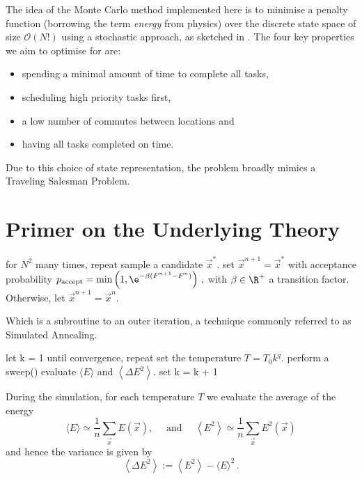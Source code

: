\documentclass{prettytex/ox/mmsc-special-topic}
\begin{document}
  The idea of the Monte Carlo method implemented here is to minimise a penalty function (borrowing the term \textit{energy} from physics) over the discrete state space of size $\mathcal{O}(N!)$ using a stochastic approach, as sketched in .
  The four key properties we aim to optimise for are:
  \begin{itemize}
    \tightlist
    \item spending a minimal amount of time to complete all tasks,
    \item scheduling high priority tasks first,
    \item a low number of commutes between locations and
    \item having all tasks completed on time.
  \end{itemize}
  Due to this choice of state representation, the problem broadly mimics a Traveling Salesman Problem.

  \section{Primer on the Underlying Theory}
  \label{sec:theory}
  \begin{algorithm}[language=pseudo,caption={\centering The Metropolis-Hastings sub-routine \parencite{metropolis, hastings}},basicstyle=\footnotesize]
for $N^2$ many times, repeat
  sample a candidate $\vec{x}^*$.
  set $\vec{x}^{n+1} = \vec{x}^*$ with acceptance probability
    $p_{\rm accept} = \min\left(1, \e^{-\beta (F^{n+1} - F^n)}\right)\,,$ with $\beta \in \R^+$ a transition factor.
  Otherwise, let $\vec{x}^{n+1} = \vec{x}^{n}$.
  \end{algorithm}

  Which is a subroutine to an outer iteration, a technique commonly referred to as Simulated Annealing.

  \begin{algorithm}[language=pseudo,caption={\centering Simulated Annealing},basicstyle=\footnotesize]
let k = 1
until convergence, repeat
  set the temperature $T = T_0 k^{q}$.
  perform a sweep()
  evaluate $\langle E\rangle$ and $\left\langle\Delta E^2\right\rangle$.
  set k = k + 1
  \end{algorithm}

  During the simulation, for each temperature $T$ we evaluate the average of the energy
  $$\langle E\rangle \simeq \frac{1}{n} \sum_{\vec{x}} E(\vec{x}), \quad \text { and } \quad\left\langle E^2\right\rangle \simeq \frac{1}{n} \sum_{\vec{x}} E^2(\vec{x})$$
  and hence the variance is given by
  $$\left\langle\Delta E^2\right\rangle:=\left\langle E^2\right\rangle-\langle E\rangle^2 \,.$$
\end{document}
